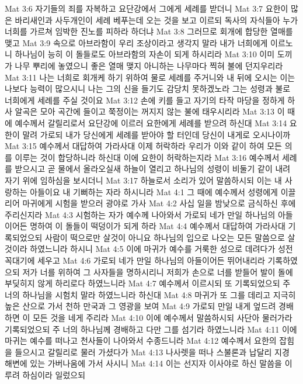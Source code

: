 Mat 3:6  자기들의 죄를 자복하고 요단강에서 그에게 세례를 받더니
Mat 3:7  요한이 많은 바리새인과 사두개인이 세례 베푸는데 오는 것을 보고 이르되 독사의 자식들아 누가 너희를 가르쳐 임박한 진노를 피하라 하더냐
Mat 3:8  그러므로 회개에 합당한 열매를 맺고
Mat 3:9  속으로 아브라함이 우리 조상이라고 생각지 말라 내가 너희에게 이르노니 하나님이 능히 이 돌들로도 아브라함의 자손이 되게 하시리라
Mat 3:10  이미 도끼가 나무 뿌리에 놓였으니 좋은 열매 맺지 아니하는 나무마다 찍혀 불에 던지우리라
Mat 3:11  나는 너희로 회개케 하기 위하여 물로 세례를 주거니와 내 뒤에 오시는 이는 나보다 능력이 많으시니 나는 그의 신을 들기도 감당치 못하겠노라 그는 성령과 불로 너희에게 세례를 주실 것이요
Mat 3:12  손에 키를 들고 자기의 타작 마당을 정하게 하사 알곡은 모아 곡간에 들이고 쭉정이는 꺼지지 않는 불에 태우시리라
Mat 3:13  이 때에 예수께서 갈릴리로서 요단강에 이르러 요한에게 세례를 받으려 하신대
Mat 3:14  요한이 말려 가로되 내가 당신에게 세례를 받아야 할 터인데 당신이 내게로 오시나이까
Mat 3:15  예수께서 대답하여 가라사대 이제 허락하라 우리가 이와 같이 하여 모든 의를 이루는 것이 합당하니라 하신대 이에 요한이 허락하는지라
Mat 3:16  예수께서 세례를 받으시고 곧 물에서 올라오실새 하늘이 열리고 하나님의 성령이 비둘기 같이 내려 자기 위에 임하심을 보시더니
Mat 3:17  하늘로서 소리가 있어 말씀하시되 이는 내 사랑하는 아들이요 내 기뻐하는 자라 하시니라
Mat 4:1  그 때에 예수께서 성령에게 이끌리어 마귀에게 시험을 받으러 광야로 가사
Mat 4:2  사십 일을 밤낮으로 금식하신 후에 주리신지라
Mat 4:3  시험하는 자가 예수께 나아와서 가로되 네가 만일 하나님의 아들이어든 명하여 이 돌들이 떡덩이가 되게 하라
Mat 4:4  예수께서 대답하여 가라사대 기록되었으되 사람이 떡으로만 살것이 아니요 하나님의 입으로 나오는 모든 말씀으로 살 것이라 하였느니라 하시니
Mat 4:5  이에 마귀가 예수를 거룩한 성으로 데려다가 성전 꼭대기에 세우고
Mat 4:6  가로되 네가 만일 하나님의 아들이어든 뛰어내리라 기록하였으되 저가 너를 위하여 그 사자들을 명하시리니 저희가 손으로 너를 받들어 발이 돌에 부딪히지 않게 하리로다 하였느니라
Mat 4:7  예수께서 이르시되 또 기록되었으되 주 너의 하나님을 시험치 말라 하였느니라 하신대
Mat 4:8  마귀가 또 그를 데리고 지극히 높은 산으로 가서 천하 만국과 그 영광을 보여
Mat 4:9  가로되 만일 내게 엎드려 경배하면 이 모든 것을 네게 주리라
Mat 4:10  이에 예수께서 말씀하시되 사단아 물러가라 기록되었으되 주 너의 하나님께 경배하고 다만 그를 섬기라 하였느니라
Mat 4:11  이에 마귀는 예수를 떠나고 천사들이 나아와서 수종드니라
Mat 4:12  예수께서 요한의 잡힘을 들으시고 갈릴리로 물러 가셨다가
Mat 4:13  나사렛을 떠나 스불론과 납달리 지경 해변에 있는 가버나움에 가서 사시니
Mat 4:14  이는 선지자 이사야로 하신 말씀을 이루려 하심이라 일렀으되
